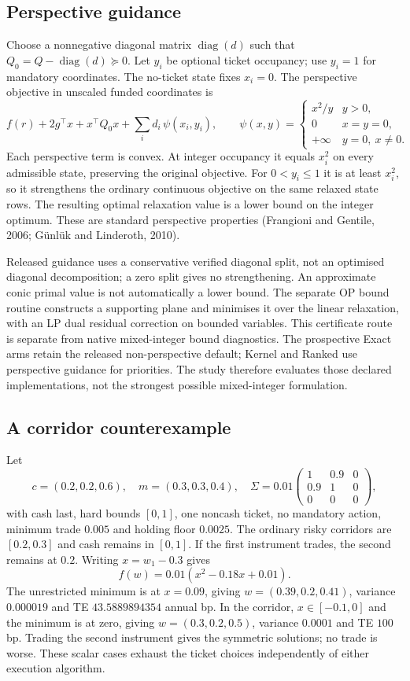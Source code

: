 \documentclass[11pt]{article}
\begin{document}
\subsection{Perspective guidance}
Choose a nonnegative diagonal matrix $\operatorname{diag}(d)$ such that
$Q_0=Q-\operatorname{diag}(d)\succeq0$. Let $y_i$ be optional ticket occupancy;
use $y_i=1$ for mandatory coordinates. The no-ticket state fixes $x_i=0$.
The perspective objective in unscaled funded coordinates is
\[
 f(r)+2g^\top x+x^\top Q_0x+\sum_i d_i\,\psi(x_i,y_i),\qquad
 \psi(x,y)=\begin{cases}x^2/y&y>0,\\0&x=y=0,\\+\infty&y=0,\ x\ne0.\end{cases}
\]
Each perspective term is convex. At integer occupancy it equals $x_i^2$ on
every admissible state, preserving the original objective. For $0<y_i\le1$
it is at least $x_i^2$, so it strengthens the ordinary continuous objective
on the same relaxed state rows. The resulting optimal relaxation value is
a lower bound on the integer optimum. These are standard perspective
properties (Frangioni and Gentile, 2006; G\"unl\"uk and Linderoth, 2010).

Released guidance uses a conservative verified diagonal split, not an
optimised diagonal decomposition; a zero split gives no strengthening.
An approximate conic primal value is not automatically a lower bound.
The separate OP bound routine constructs a supporting plane and minimises it
over the linear relaxation, with an LP dual residual correction on bounded
variables. This certificate route is separate from native mixed-integer bound
diagnostics. The prospective Exact arms retain the released non-perspective
default; Kernel and Ranked use perspective guidance for priorities. The study
therefore evaluates those declared implementations, not the strongest possible
mixed-integer formulation.

\subsection{A corridor counterexample}
Let
\[
 c=(0.2,0.2,0.6),\quad m=(0.3,0.3,0.4),\quad
 \Sigma=0.01\begin{pmatrix}1&0.9&0\\0.9&1&0\\0&0&0\end{pmatrix},
\]
with cash last, hard bounds $[0,1]$, one noncash ticket, no mandatory action,
minimum trade $0.005$ and holding floor $0.0025$. The ordinary risky corridors
are $[0.2,0.3]$ and cash remains in $[0,1]$.
If the first instrument trades, the second remains at $0.2$. Writing
$x=w_1-0.3$ gives
\[
 f(w)=0.01(x^2-0.18x+0.01).
\]
The unrestricted minimum is at $x=0.09$, giving $w=(0.39,0.2,0.41)$,
variance $0.000019$ and TE $43.5889894354$ annual bp. In the corridor,
$x\in[-0.1,0]$ and the minimum is at zero, giving $w=(0.3,0.2,0.5)$,
variance $0.0001$ and TE $100$ bp. Trading the second instrument gives the
symmetric solutions; no trade is worse. These scalar cases exhaust the ticket
choices independently of either execution algorithm.
\end{document}
